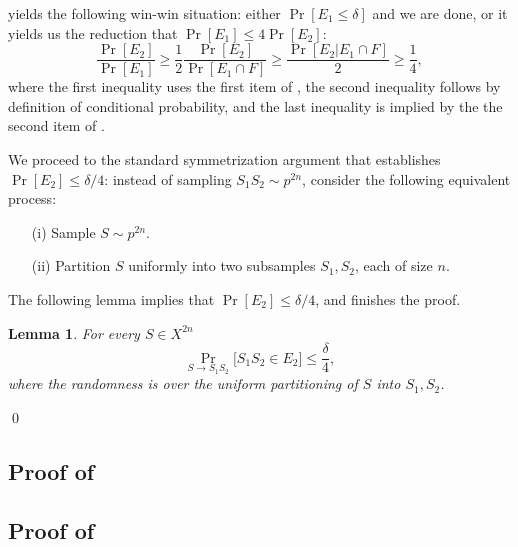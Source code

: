 \documentclass{article}
\newtheorem{lemma}[theorem]{Lemma}
\begin{document}
 yields the following win-win situation:
either $\Pr[E_1 \leq \delta]$ and we are done, or 
it yields us the reduction that $\Pr[E_1]\leq 4\Pr[E_2]$:
\[\frac{\Pr[E_2]}{\Pr[E_1]} \geq  \frac{1}{2}\frac{\Pr[E_2]}{\Pr[E_1\cap F]} \geq \frac{\Pr[E_2 \vert E_1\cap F]}{2} \geq \frac{1}{4},\]
where the first inequality uses the first item of , 
the second inequality follows by definition of conditional probability,
and the last inequality is implied by the the second item of .


We proceed to the standard symmetrization argument
that establishes $\Pr[E_2]\leq\delta/4$:
instead of sampling $S_1S_2\sim p^{2n}$,
consider the following equivalent process:
\begin{itemize}
\item[(i)] Sample $S\sim p^{2n}$.
\item[(ii)] Partition $S$ uniformly into two subsamples $S_1,S_2$, each of size $n$.
\end{itemize}
The following lemma implies that $\Pr[E_2]\leq \delta/4$, and finishes the proof.
\begin{lemma}\label{lem:e2}
For every $S\in X^{2n}$
\[\Pr_{S\to S_1S_2}\bigl[S_1S_2\in E_2\bigr]\leq \frac{\delta}{4},\]
where the randomness is over the uniform partitioning
of $S$ into $S_1,S_2$.
\end{lemma}
\qed

\subsection{Proof of }

\subsection{Proof of }
\end{document}
